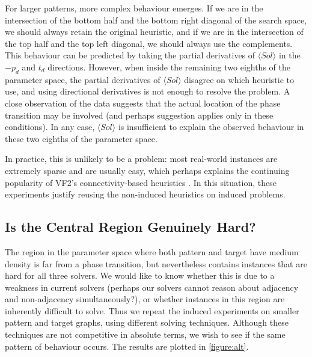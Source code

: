 \documentclass[twoside,11pt]{article}
\newcommand{\citep}[1]{\cite{#1}}
\begin{document}
For larger patterns, more complex behaviour emerges. If we are in the intersection of the bottom half
and the bottom right diagonal of the search space, we should always retain the original heuristic,
and if we are in the intersection of the top half and the top left diagonal, we should always use
the complements. This behaviour can be predicted by taking the partial derivatives of $\langle Sol
\rangle$ in the $-p_d$ and $t_d$ directions.  However, when inside the remaining two eighths of the
parameter space, the partial derivatives of $\langle Sol \rangle$ disagree on which heuristic to
use, and using directional derivatives is not enough to resolve the problem. A close observation of
the data suggests that the actual location of the phase transition may be involved (and perhaps
 suggestion applies only in these conditions). In any case, $\langle Sol
\rangle$ is insufficient to explain the observed behaviour in these two eighths of the parameter space.

In practice, this is unlikely to be a problem: most real-world instances are extremely sparse and
are usually easy, which perhaps explains the continuing popularity of VF2's connectivity-based
heuristics \citep{Carletti:2015}. In this situation, these experiments justify reusing the
non-induced heuristics on induced problems.

\subsection{Is the Central Region Genuinely Hard?}

The region in the parameter space where both pattern and target have medium density is far from a
phase transition, but nevertheless contains instances that are hard for all three solvers. We would
like to know whether this is due to a weakness in current solvers (perhaps our solvers cannot reason
about adjacency and non-adjacency simultaneously?), or whether instances in this region are
inherently difficult to solve.  Thus we repeat the induced experiments on smaller pattern and target
graphs, using different solving techniques.  Although these techniques are not competitive in
absolute terms, we wish to see if the same pattern of behaviour occurs. The results are plotted in
\cref{figure:alt}.
\end{document}
